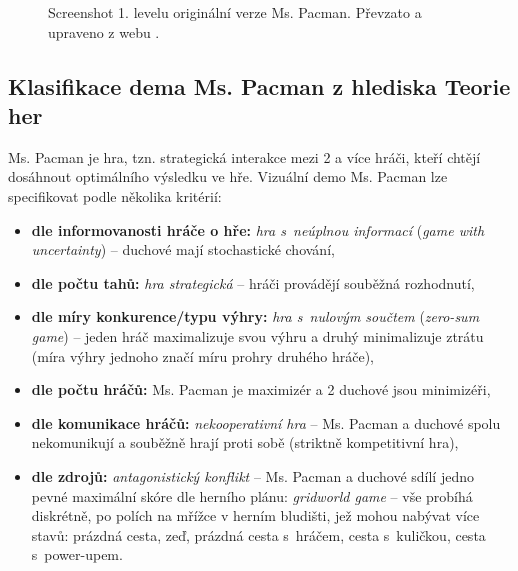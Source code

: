 \begin{figure}[!htbp]
\begin{center}
  \caption[]{Screenshot 1. levelu originální verze Ms. Pacman. Převzato a upraveno z webu \footnotemark{}.}
  \label{img:mspac}
\end{center}
\end{figure}

\subsection*{Klasifikace dema Ms. Pacman z hlediska Teorie her}
Ms. Pacman je hra, tzn. strategická interakce mezi 2 a více hráči, kteří chtějí dosáhnout optimálního výsledku ve hře.
Vizuální demo Ms. Pacman lze specifikovat podle několika kritérií:
\begin{itemize}
  \item \textbf{dle informovanosti hráče o hře:} \textit{hra s neúplnou informací} (\textit{game with uncertainty}) -- duchové mají stochastické chování,
  \item \textbf{dle počtu tahů:} \textit{hra strategická} – hráči provádějí souběžná rozhodnutí,
  \item \textbf{dle míry konkurence/typu výhry:} \textit{hra s nulovým součtem} (\textit{zero-sum game})  -- jeden hráč maximalizuje svou výhru a druhý minimalizuje ztrátu (míra výhry jednoho značí míru prohry druhého hráče),
  \item \textbf{dle počtu hráčů:} Ms. Pacman je maximizér a 2 duchové jsou minimizéři,
  \item \textbf{dle komunikace hráčů:} \textit{nekooperativní hra} – Ms. Pacman a duchové spolu nekomunikují a souběžně hrají proti sobě (striktně kompetitivní hra),
  \item \textbf{dle zdrojů:} \textit{antagonistický konflikt} – Ms. Pacman a duchové sdílí jedno pevné maximální skóre dle herního plánu: \textit{gridworld game} – vše probíhá diskrétně, po polích na mřížce v herním bludišti, jež mohou nabývat více stavů: prázdná cesta, zeď, prázdná cesta s hráčem, cesta s kuličkou, cesta s power-upem.
\end{itemize}

